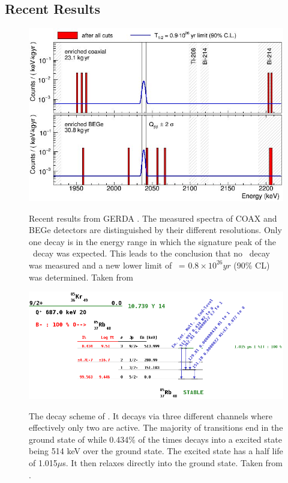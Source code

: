 \documentclass[encoding=utf8,british]{tumphthesis}
\begin{document}
\subsection{Recent Results}
\label{sec:ResultsofGERDA}
\begin{figure}[t!]
	\centering
	\begin{minipage}{0.45\textwidth}
		\centering
		\includegraphics[width=\textwidth]{./Bilder/GerdaErgebnisse.png}
		\caption{Recent results from GERDA \PII. The measured spectra of COAX and BEGe detectors are distinguished by their different resolutions.  Only one decay is in the energy range in which the signature peak of the \onbb\ decay was expected. This leads to the conclusion that no \onbb\ decay was measured and a new lower limit of \thalfzero\ = $0.8\times10^{26}\unit{yr}$ (90$\%$ CL) was determined. Taken from \cite{zsigmond_new_2018}}
		\label{fig:GerdaErgebnisse}
	\end{minipage}\hfill%
	\begin{minipage}{.50\textwidth}
		\centering
	\includegraphics[width=\textwidth]{./Bilder/Kr85Decay.png}
	\label{fig:Decay}
	\caption{
	The decay scheme of \Kr. It decays via three different channels where effectively only two are active. The majority of transitions end in the ground state of  while 0.434$\%$ of the times \Kr decays into a excited state being 514 keV over the ground state. The excited state has a half life of 1.015$\mu$s. It then relaxes directly into the ground state. Taken from \cite{noauthor_livechart_nodate}.
	}
	\end{minipage}
\end{figure}
\end{document}
